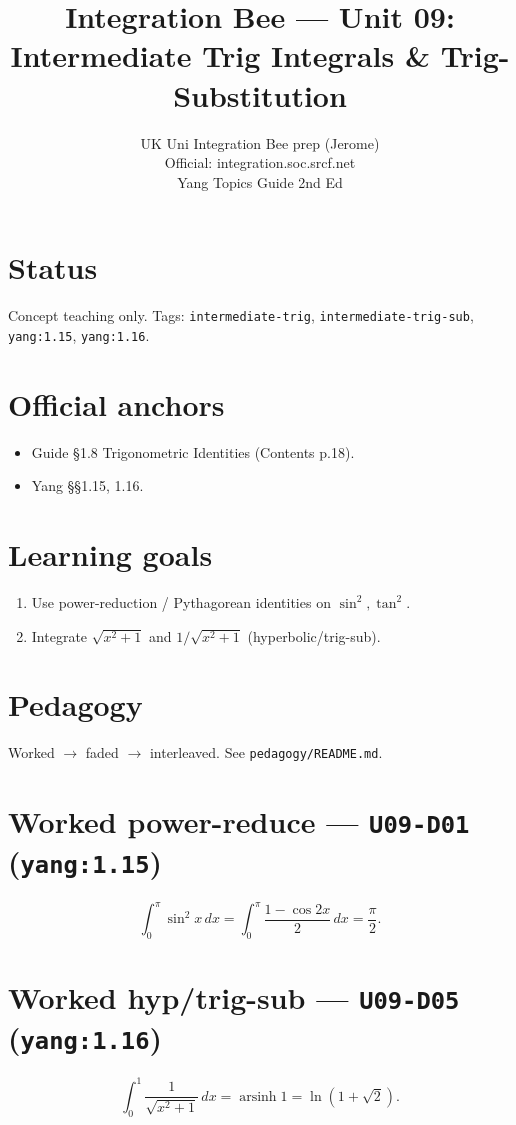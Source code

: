 
\title{Integration Bee --- Unit 09:\\ Intermediate Trig Integrals \& Trig-Substitution}
\author{UK Uni Integration Bee prep (Jerome)\\ Official: integration.soc.srcf.net\\ Yang Topics Guide 2nd Ed}
\date{}

\maketitle
\section*{Status}
Concept teaching only. Tags: \texttt{intermediate-trig}, \texttt{intermediate-trig-sub}, \texttt{yang:1.15}, \texttt{yang:1.16}.
\section{Official anchors}
\begin{itemize}
  \item Guide §1.8 Trigonometric Identities (Contents p.18).
  \item Yang §§1.15, 1.16.
\end{itemize}
\section{Learning goals}
\begin{enumerate}
  \item Use power-reduction / Pythagorean identities on $\sin^2,\tan^2$.
  \item Integrate $\sqrt{x^2+1}$ and $1/\sqrt{x^2+1}$ (hyperbolic/trig-sub).
\end{enumerate}
\section{Pedagogy}
Worked $\to$ faded $\to$ interleaved. See \texttt{pedagogy/README.md}.

\section{Worked power-reduce --- \texttt{U09-D01} (\texttt{yang:1.15})}
\[
\int_0^{\pi}\sin^2 x\,dx = \int_0^{\pi}\frac{1-\cos 2x}{2}\,dx=\frac\pi2.
\]

\section{Worked hyp/trig-sub --- \texttt{U09-D05} (\texttt{yang:1.16})}
\[
\int_0^1\frac{1}{\sqrt{x^2+1}}\,dx=\operatorname{arsinh}1=\ln(1+\sqrt2).
\]

